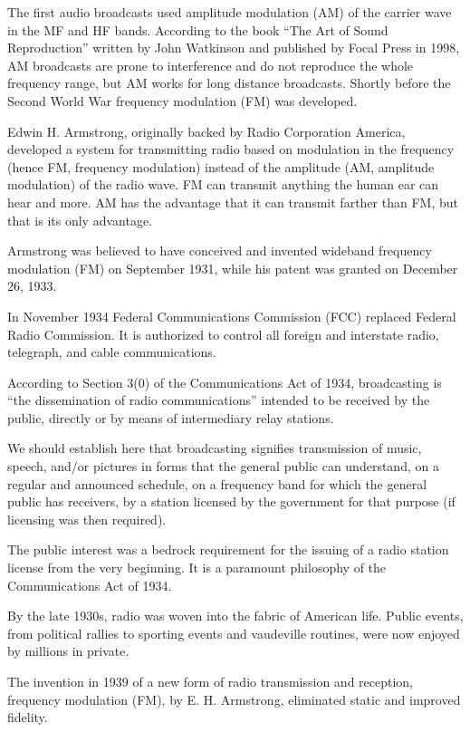 \documentclass[a4paper,norsk,utf8]{report}
\begin{document}
    The first audio broadcasts used amplitude modulation (AM) of the
    carrier wave in the MF and HF bands.  According to the book ``The
    Art of Sound Reproduction'' written by John Watkinson and published
    by Focal Press in 1998, AM broadcasts are prone to interference
    and do not reproduce the whole frequency range, but AM works for
    long distance broadcasts.  Shortly before the Second World War frequency
    modulation (FM) was developed.

    Edwin H. Armstrong, originally backed by Radio Corporation America,
    developed a system for transmitting radio based on modulation in the
    frequency (hence FM, frequency modulation) instead of the amplitude (AM,
    amplitude modulation) of the radio wave.   FM can transmit anything the
    human ear can hear and more.  AM has the advantage that it can transmit
    farther than FM, but that is its only advantage.

    Armstrong was believed to have conceived and invented wideband
    frequency modulation (FM) on September 1931, while his patent was
    granted on December 26, 1933.

    In November 1934 Federal Communications Commission (FCC) replaced
    Federal Radio Commission.  It is authorized to control all foreign
    and interstate radio, telegraph, and cable communications.

    According to Section 3(0) of the Communications Act of 1934,
    broadcasting is ``the dissemination of radio communications''
    intended to be received by the public, directly or by means
    of intermediary relay stations.

    We should establish here that broadcasting signifies transmission
    of music, speech, and/or pictures in forms that the general public
    can understand, on a regular and announced schedule, on a frequency
    band for which the general public has receivers, by a station
    licensed by the government for that purpose (if licensing was then
    required).

    The public interest was a bedrock requirement for the issuing of a
    radio station license from the very beginning.  It is a paramount
    philosophy of the Communications Act of 1934.

    By the late 1930s, radio was woven into the fabric of American life.
    Public events, from political rallies to sporting events and vaudeville
    routines, were now enjoyed by millions in private.
    
    The invention in 1939 of a new form of radio transmission and 
    reception, frequency modulation (FM), by E. H. Armstrong,
    eliminated static and improved fidelity.
\end{document}
